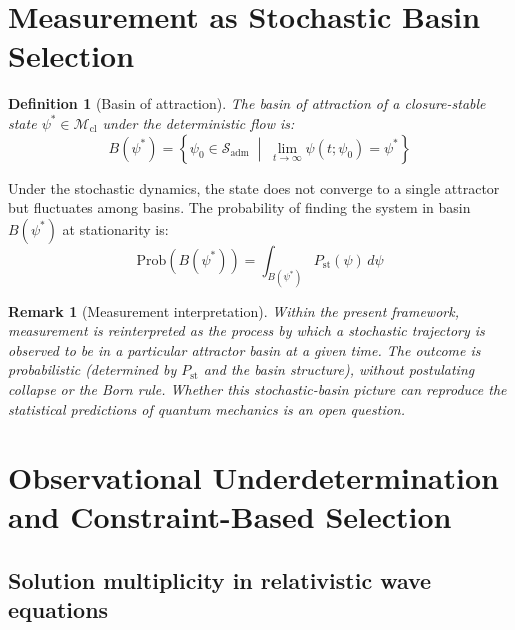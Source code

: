 \documentclass[12pt]{article}
\newtheorem{definition}[theorem]{Definition}
\newtheorem{remark}[theorem]{Remark}
\newcommand{\Mcl}{\mathcal{M}_{\mathrm{cl}}}
\newcommand{\Sadm}{\mathcal{S}_{\mathrm{adm}}}
\begin{document}
\section{Measurement as Stochastic Basin Selection}\label{sec:measurement}

\begin{definition}[Basin of attraction]\label{def:basin}
The basin of attraction of a closure-stable state $\psi^* \in \Mcl$ under the deterministic flow is:
\begin{equation}
    B(\psi^*) = \left\{\psi_0 \in \Sadm \;\middle|\; \lim_{t \to \infty} \psi(t; \psi_0) = \psi^*\right\}
\end{equation}
\end{definition}

Under the stochastic dynamics, the state does not converge to a single attractor but fluctuates among basins. The probability of finding the system in basin $B(\psi^*)$ at stationarity is:
\begin{equation}
    \mathrm{Prob}(B(\psi^*)) = \int_{B(\psi^*)} P_{\mathrm{st}}(\psi)\, d\psi
\end{equation}

\begin{remark}[Measurement interpretation]
Within the present framework, measurement is reinterpreted as the process by which a stochastic trajectory is observed to be in a particular attractor basin at a given time. The outcome is probabilistic (determined by $P_{\mathrm{st}}$ and the basin structure), without postulating collapse or the Born rule. Whether this stochastic-basin picture can reproduce the statistical predictions of quantum mechanics is an open question.
\end{remark}

\section{Observational Underdetermination and Constraint-Based Selection}\label{sec:underdetermination}

\subsection{Solution multiplicity in relativistic wave equations}
\end{document}
